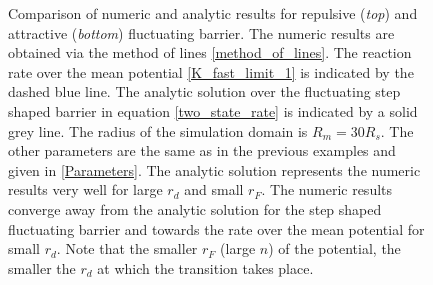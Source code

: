 \begin{minipage}[t]{.63 \textwidth}
\begin{figure}[H]
    \end{figure}
\end{minipage}
\begin{minipage}[t]{.37 \textwidth}
    \begin{figure}[H]
        \caption{Comparison of numeric and analytic results for repulsive (\emph{top}) and attractive (\emph{bottom}) fluctuating barrier. The numeric results are obtained via the method of lines \ref{method_of_lines}. The reaction rate over the mean potential \eqref{K_fast_limit_1} is indicated by the dashed blue line. The analytic solution over the fluctuating step shaped barrier in equation \eqref{two_state_rate} is indicated by a solid grey line. The radius of the simulation domain is $R_m=30 R_s$. The other parameters are the same as in the previous examples and given in \ref{Parameters}. The analytic solution represents the numeric results very well for large $r_d$ and small $r_F$. The numeric results converge away from the analytic solution for the step shaped fluctuating barrier and towards the rate over the mean potential for small $r_d$. Note that the smaller $r_F$ (large $n$) of the potential, the smaller the $r_d$ at which the transition takes place.\label{numeric}}
    \end{figure}
  \end{minipage}

